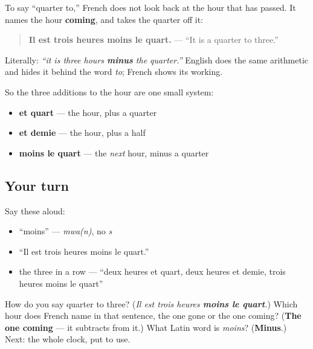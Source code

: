 \begin{grammarlens}[title={Grammar Lens: French subtracts from the next hour}]
To say \textquotedblleft{}quarter to,\textquotedblright{} French does not look back at the hour that has passed. It names the hour \textbf{coming}, and takes the quarter off it:

\begin{quote}
\textbf{Il est trois heures moins le quart.} — \textquotedblleft{}It is a quarter to three.\textquotedblright{}
\end{quote}

Literally: \emph{\textquotedblleft{}it is three hours \textbf{minus} the quarter.\textquotedblright{}} English does the same arithmetic and hides it behind the word \emph{to}; French shows its working.

So the three additions to the hour are one small system:

\begin{itemize}
\raggedright
  \item \textbf{et quart} — the hour, plus a quarter
  \item \textbf{et demie} — the hour, plus a half
  \item \textbf{moins le quart} — the \emph{next} hour, minus a quarter
\end{itemize}
\end{grammarlens}

\subsection*{Your turn}
Say these aloud:

\begin{itemize}
\raggedright
  \item \textquotedblleft{}moins\textquotedblright{} — \emph{mwa(n)}, no \emph{s}
  \item \textquotedblleft{}Il est trois heures moins le quart.\textquotedblright{}
  \item the three in a row — \textquotedblleft{}deux heures et quart, deux heures et demie, trois heures moins le quart\textquotedblright{}
\end{itemize}

\begin{tcolorbox}[breakable,colback=teal!4,colframe=teal!35!black,title={Before you move on}]
How do you say quarter to three? (\emph{Il est trois heures \textbf{moins le quart}.}) Which hour does French name in that sentence, the one gone or the one coming? (\textbf{The one coming} — it subtracts from it.) What Latin word is \emph{moins}? (\textbf{Minus}.) Next: the whole clock, put to use.
\end{tcolorbox}
